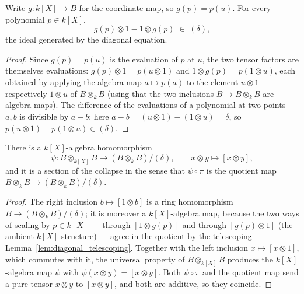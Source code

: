 \begin{lemma}
  \label{lem:diagonal_telescoping}
  \leanok
  Write \(g \colon k[X] \to B\) for the coordinate map, so \(g(p) = p(u)\). For every polynomial
  \(p \in k[X]\),
  \[
    g(p) \otimes 1 - 1 \otimes g(p) \;\in\; (\delta),
  \]
  the ideal generated by the diagonal equation.
\end{lemma}
\begin{proof}
  \leanok
  Since \(g(p) = p(u)\) is the evaluation of \(p\) at \(u\), the two tensor factors are
  themselves evaluations: \(g(p) \otimes 1 = p(u \otimes 1)\) and \(1 \otimes g(p) = p(1 \otimes
  u)\), each obtained by applying the algebra map \(a \mapsto p(a)\) to the element \(u \otimes 1\)
  respectively \(1 \otimes u\) of \(B \otimes_k B\) (using that the two inclusions \(B \to B
  \otimes_k B\) are algebra maps). The difference of the evaluations of a polynomial at two
  points \(a, b\) is divisible by \(a - b\); here \(a - b = (u \otimes 1) - (1 \otimes u) =
  \delta\), so \(p(u \otimes 1) - p(1 \otimes u) \in (\delta)\).
\end{proof}

\begin{lemma}
  \label{lem:diagonal_section}
  \leanok
  There is a \(k[X]\)-algebra homomorphism
  \[
    \psi \colon B \otimes_{k[X]} B \longrightarrow (B \otimes_k B)/(\delta), \qquad x \otimes y
    \mapsto [x \otimes y],
  \]
  and it is a section of the collapse in the sense that \(\psi \circ \pi\) is the quotient map
  \(B \otimes_k B \to (B \otimes_k B)/(\delta)\).
\end{lemma}
\begin{proof}
  \leanok
  The right inclusion \(b \mapsto [1 \otimes b]\) is a ring homomorphism \(B \to (B \otimes_k
  B)/(\delta)\); it is moreover a \(k[X]\)-algebra map, because the two ways of scaling by \(p \in
  k[X]\) — through \([1 \otimes g(p)]\) and through \([g(p) \otimes 1]\) (the ambient
  \(k[X]\)-structure) — agree in the quotient by the telescoping
  Lemma~\ref{lem:diagonal_telescoping}. Together with the left inclusion \(x \mapsto [x \otimes
  1]\), which commutes with it, the universal property of \(B \otimes_{k[X]} B\) produces the
  \(k[X]\)-algebra map \(\psi\) with \(\psi(x \otimes y) = [x \otimes y]\). Both \(\psi \circ \pi\)
  and the quotient map send a pure tensor \(x \otimes y\) to \([x \otimes y]\), and both are
  additive, so they coincide.
\end{proof}

